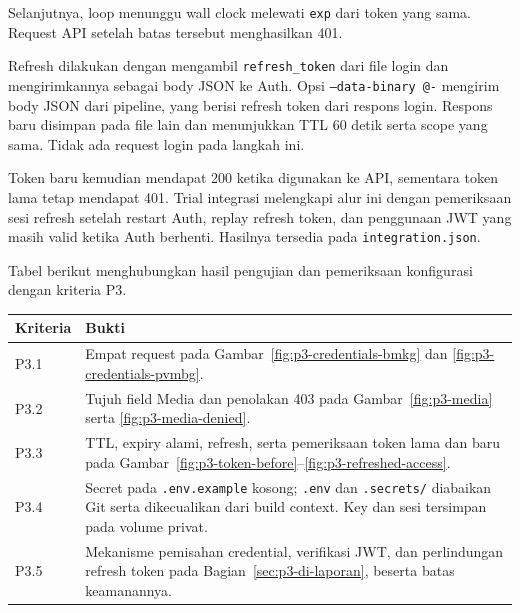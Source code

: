 Selanjutnya, loop menunggu wall clock melewati \texttt{exp} dari token yang sama. Request API setelah batas tersebut menghasilkan 401.

Refresh dilakukan dengan mengambil \texttt{refresh\_token} dari file login dan mengirimkannya sebagai body JSON ke Auth. Opsi \texttt{--data-binary @-} mengirim body JSON dari pipeline, yang berisi refresh token dari respons login. Respons baru disimpan pada file lain dan menunjukkan TTL 60 detik serta scope yang sama. Tidak ada request login pada langkah ini.

Token baru kemudian mendapat 200 ketika digunakan ke API, sementara token lama tetap mendapat 401. Trial integrasi melengkapi alur ini dengan pemeriksaan sesi refresh setelah restart Auth, replay refresh token, dan penggunaan JWT yang masih valid ketika Auth berhenti. Hasilnya tersedia pada \texttt{integration.json}.

Tabel berikut menghubungkan hasil pengujian dan pemeriksaan konfigurasi dengan kriteria P3.
\begin{table}[H]
\centering\small
\begin{tabularx}{\textwidth}{>{\raggedright\arraybackslash}p{2cm}Y}
\toprule
Kriteria & Bukti \\
\midrule
P3.1 & Empat request pada Gambar~\ref{fig:p3-credentials-bmkg} dan \ref{fig:p3-credentials-pvmbg}. \\
P3.2 & Tujuh field Media dan penolakan 403 pada Gambar~\ref{fig:p3-media} serta \ref{fig:p3-media-denied}. \\
P3.3 & TTL, expiry alami, refresh, serta pemeriksaan token lama dan baru pada Gambar~\ref{fig:p3-token-before}--\ref{fig:p3-refreshed-access}. \\
P3.4 & Secret pada \texttt{.env.example} kosong; \texttt{.env} dan \texttt{.secrets/} diabaikan Git serta dikecualikan dari build context. Key dan sesi tersimpan pada volume privat. \\
P3.5 & Mekanisme pemisahan credential, verifikasi JWT, dan perlindungan refresh token pada Bagian~\ref{sec:p3-di-laporan}, beserta batas keamanannya. \\
\bottomrule
\end{tabularx}
\end{table}

